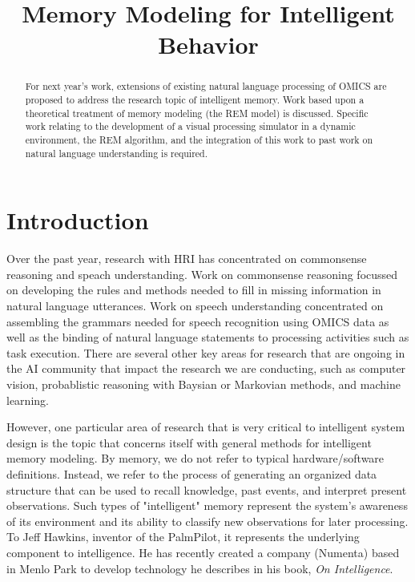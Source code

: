 \documentclass[12pt]{amsart}
\title{\bf Memory Modeling for Intelligent Behavior}
\begin{document}
\maketitle

\begin{abstract}

For next year's work, extensions of existing natural language
processing of OMICS are proposed to address the research topic of
intelligent memory.  Work based upon a theoretical treatment of memory
modeling (the REM model) is discussed.  Specific work relating to the
development of a visual processing simulator in a dynamic environment,
the REM algorithm, and the integration of this work to past work on
natural language understanding is required.

\end{abstract}

\section{Introduction}

Over the past year, research with HRI has concentrated on
commonsense reasoning and speach understanding.  Work on 
commonsense reasoning focussed on developing the rules and methods
needed to fill in missing information in natural language utterances.
Work on speech understanding concentrated on assembling the grammars 
needed for speech recognition using OMICS data as well as the binding
of natural language statements to processing activities such as 
task execution.  There are several other key areas for research that 
are ongoing in the AI community that impact the research we are conducting,
such as computer vision, probablistic reasoning with Baysian or Markovian
methods, and machine learning.  

However, one particular area of research that is very critical to
intelligent system design is the topic that concerns itself with
general methods for intelligent memory modeling.  By memory, we do not
refer to typical hardware/software definitions.  Instead, we refer to
the process of generating an organized data structure that can be used
to recall knowledge, past events, and interpret present observations.
Such types of "intelligent" memory represent the system's awareness of
its environment and its ability to classify new observations for later
processing.  To Jeff Hawkins, inventor of the PalmPilot, it represents
the underlying component to intelligence.  He has recently created a
company (Numenta) based in Menlo Park to develop technology he
describes in his book, {\it On Intelligence}.
\end{document}
